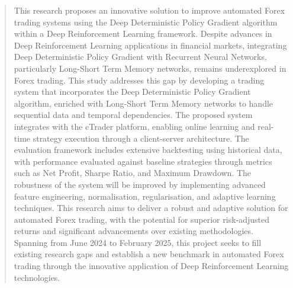 \begin{abstract}
This research proposes an innovative solution to improve automated Forex trading systems using the Deep Deterministic Policy Gradient algorithm within a Deep Reinforcement Learning framework. Despite advances in Deep Reinforcement Learning applications in financial markets, integrating Deep Deterministic Policy Gradient with Recurrent Neural Networks, particularly Long-Short Term Memory networks, remains underexplored in Forex trading. This study addresses this gap by developing a trading system that incorporates the Deep Deterministic Policy Gradient algorithm, enriched with Long-Short Term Memory networks to handle sequential data and temporal dependencies. The proposed system integrates with the cTrader platform, enabling online learning and real-time strategy execution through a client-server architecture. The evaluation framework includes extensive backtesting using historical data, with performance evaluated against baseline strategies through metrics such as Net Profit, Sharpe Ratio, and Maximum Drawdown. The robustness of the system will be improved by implementing advanced feature engineering, normalisation, regularisation, and adaptive learning techniques. This research aims to deliver a robust and adaptive solution for automated Forex trading, with the potential for superior risk-adjusted returns and significant advancements over existing methodologies. Spanning from June 2024 to February 2025, this project seeks to fill existing research gaps and establish a new benchmark in automated Forex trading through the innovative application of Deep Reinforcement Learning technologies.
\clearpage
\end{abstract}
